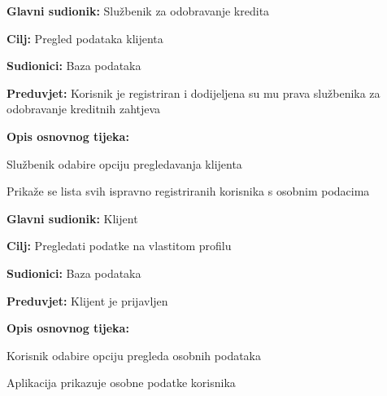                 \noindent {}
                \begin{packed_item}
                
                  \item \textbf{Glavni sudionik: } Službenik za odobravanje kredita
                  \item  \textbf{Cilj:} Pregled podataka klijenta
                  \item  \textbf{Sudionici:} Baza podataka
                  \item  \textbf{Preduvjet:} Korisnik je registriran i dodijeljena su mu prava službenika za odobravanje kreditnih zahtjeva 
                  \item  \textbf{Opis osnovnog tijeka:}
                  
                  \item[] \begin{packed_enum}
                
                    \item Službenik odabire opciju pregledavanja klijenta
                    \item Prikaže se lista svih ispravno registriranih korisnika s osobnim podacima
                    
                  \end{packed_enum}
                \end{packed_item}   
        			
        				\noindent {}
        			\begin{packed_item}
        				
        				\item \textbf{Glavni sudionik: }Klijent
        				\item  \textbf{Cilj:} Pregledati podatke na vlastitom profilu
        				\item  \textbf{Sudionici:} Baza podataka
        				\item  \textbf{Preduvjet:} Klijent je prijavljen
        				\item  \textbf{Opis osnovnog tijeka:}
        				
        				\item[] \begin{packed_enum}
        					
        					\item Korisnik odabire opciju pregleda osobnih podataka
        					\item Aplikacija prikazuje osobne podatke korisnika
        			
        					
    					
    				\end{packed_enum}
    				
    			\end{packed_item}
    			
